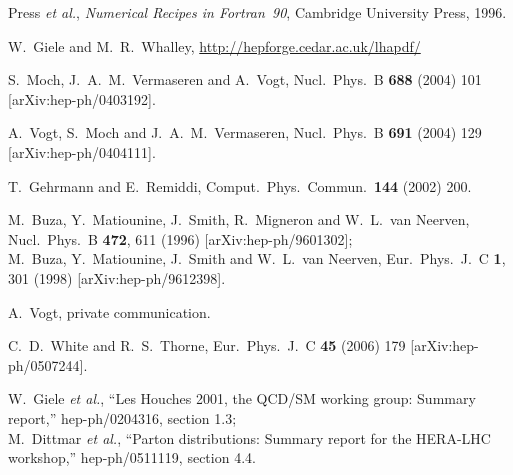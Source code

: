\documentclass[12pt]{article}
\begin{document}
\begin{thebibliography}{99}
  Press {\it et al.}, \emph{Numerical Recipes in Fortran~90},
  Cambridge University Press, 1996.

 W.~Giele and M.~R.~Whalley,
\url{http://hepforge.cedar.ac.uk/lhapdf/}


  S.~Moch, J.~A.~M.~Vermaseren and A.~Vogt,
  Nucl.\ Phys.\ B {\bf 688} (2004) 101
  [arXiv:hep-ph/0403192].

  A.~Vogt, S.~Moch and J.~A.~M.~Vermaseren,
  Nucl.\ Phys.\ B {\bf 691} (2004) 129
  [arXiv:hep-ph/0404111].


  T.~Gehrmann and E.~Remiddi,
  Comput.\ Phys.\ Commun.\  {\bf 144} (2002) 200.


  M.~Buza, Y.~Matiounine, J.~Smith, R.~Migneron and W.~L.~van Neerven,
  Nucl.\ Phys.\ B {\bf 472}, 611 (1996)
  [arXiv:hep-ph/9601302];\\
%
  M.~Buza, Y.~Matiounine, J.~Smith and W.~L.~van Neerven,
  Eur.\ Phys.\ J.\ C {\bf 1}, 301 (1998)
  [arXiv:hep-ph/9612398].
  
 A.~Vogt, private communication.


  C.~D.~White and R.~S.~Thorne,
  Eur.\ Phys.\ J.\ C {\bf 45} (2006) 179
  [arXiv:hep-ph/0507244].

  W.~Giele {\it et al.},
  ``Les Houches 2001, the QCD/SM working group: Summary report,''
  hep-ph/0204316, section 1.3;\\
  M.~Dittmar {\it et al.},
  ``Parton distributions: Summary report for the HERA-LHC workshop,''
  hep-ph/0511119, section 4.4.



\end{thebibliography}
\end{document}
